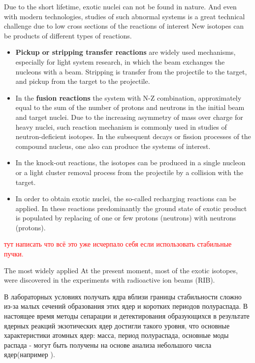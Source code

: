 Due to the short lifetime, exotic nuclei can not be found in nature.
And even with modern technologies, studies of such abnormal systems is a great technical challenge due to low cross sections of the reactions of interest
New isotopes can be products of different types of reactions.
\begin{itemize}
	\item 
	\textbf{Pickup or stripping transfer reactions} are widely used mechanisms, especially for light system research, in which the beam exchanges the nucleons with a beam. 
	Stripping is transfer from the projectile to the target, and pickup from the target to the projectile.
	
	\item 
	In the \textbf{fusion reactions} the system with N-Z combination, approximately equal to the sum of the number of protons and neutrons in the initial beam and target nuclei.
	Due to the increasing asymmetry of mass over charge for heavy nuclei, such reaction mechanism is commonly used in studies of neutron-deficient isotopes.	
	In the subsequent decays or fission processes of the compound nucleus, one also can produce the systems of interest. 
	
	\item
	In the knock-out reactions, the isotopes can be produced in a single nucleon or a light cluster removal process from the projectile by a collision with the target.
	
	\item
	In order to obtain exotic nuclei, the so-called recharging reactions can be applied.
	In these reactions predominantly  the ground state of exotic product is populated by replacing of one or few protons (neutrons) with neutrons (protons).
	
	
\end{itemize}	

\textcolor{red}{тут написать что всё это уже исчерпало себя если использовать стабильные пучки.}



The most widely applied 
At the present moment, most of the exotic isotopes, were discovered in the experiments with radioactive ion beams (RIB).


В лабораторных условиях получать ядра вблизи границы стабильности сложно из-за малых сечений образования этих ядер и коротких периодов полураспада. В настоящее время методы сепарации и детектирования образующихся в результате ядерных реакций экзотических ядер достигли такого уровня, что основные характеристики атомных ядер: масса, период полураспада, основные моды распада - могут быть получены на основе анализа небольшого числа ядер(например \cite{flnr}).

